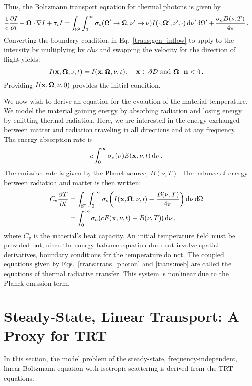 \documentclass[../doc.tex]{subfiles}
\begin{document}
Thus, the Boltzmann transport equation for thermal photons is given by 
	\begin{equation} \label{trans:trans_photon}
		\frac{1}{c}\frac{\partial I}{\partial t} + \boldsymbol{\Omega}\cdot\nabla I + \sigma_t I = \int_{\mathbb{S}^2}\int_0^\infty \sigma_s(\boldsymbol{\Omega}'\rightarrow\boldsymbol{\Omega},\nu'\rightarrow \nu) I(\cdot,\boldsymbol{\Omega}',\nu',\cdot) \mathop{}\!\mathrm{d} \nu'\mathop{}\!\mathrm{d}\Omega' + \frac{\sigma_a B(\nu,T)}{4\pi} \,. 
	\end{equation}
Converting the boundary condition in Eq.~\ref{trans:gen_inflow} to apply to the intensity by multiplying by $ch\nu$ and swapping the velocity for the direction of flight yields: 
	\begin{equation}
		I(\boldsymbol{\mathrm{x}},\boldsymbol{\Omega},\nu,t) = \bar{I}(\boldsymbol{\mathrm{x}},\boldsymbol{\Omega},\nu,t) \,, \quad \boldsymbol{\mathrm{x}} \in \partial \mathcal{D} \ \mathrm{and} \ \boldsymbol{\Omega}\cdot\boldsymbol{\mathrm{n}} < 0 \,. 
	\end{equation}
Providing $I(\boldsymbol{\mathrm{x}},\boldsymbol{\Omega},\nu,0)$ provides the initial condition. 

We now wish to derive an equation for the evolution of the material temperature. We model the material gaining energy by absorbing radiation and losing energy by emitting thermal radiation. Here, we are interested in the energy exchanged between matter and radiation traveling in all directions and at any frequency. 
The energy absorption rate is 
	\begin{equation}
		c\int_0^\infty \sigma_a(\nu) E(\boldsymbol{\mathrm{x}},\nu,t) \mathop{}\!\mathrm{d} \nu \,. 
	\end{equation}
The emission rate is given by the Planck source, $B(\nu,T)$.
The balance of energy between radiation and matter is then written: 
	\begin{equation} \label{trans:meb}
	\begin{aligned}
		C_v \frac{\partial T}{\partial t} &= \int_{\mathbb{S}^2} \int_0^\infty \sigma_a\!\left( I(\boldsymbol{\mathrm{x}},\boldsymbol{\Omega},\nu,t) - \frac{B(\nu,T)}{4\pi} \right) \mathop{}\!\mathrm{d} \nu \mathop{}\!\mathrm{d} \Omega \\
		&= \int_0^\infty \sigma_a (c E(\boldsymbol{\mathrm{x}},\nu,t) - B(\nu,T)) \mathop{}\!\mathrm{d} \nu \,, 
	\end{aligned}
	\end{equation}
where $C_v$ is the material's heat capacity. 
An initial temperature field must be provided but, since the energy balance equation does not involve spatial derivatives, boundary conditions for the temperature do not. 
The coupled equations given by Eqs.~\ref{trans:trans_photon} and \ref{trans:meb} are called the equations of thermal radiative transfer. This system is nonlinear due to the Planck emission term. 

\section{Steady-State, Linear Transport: A Proxy for TRT}
In this section, the model problem of the steady-state, frequency-independent, linear Boltzmann equation with isotropic scattering is derived from the TRT equations. 
\end{document}

